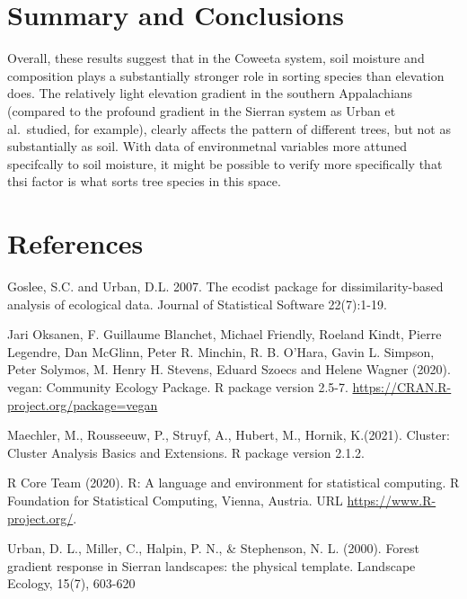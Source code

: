 \documentclass[
  12pt,
]{article}
\begin{document}
\newpage

\hypertarget{summary-and-conclusions}{%
\section{Summary and Conclusions}\label{summary-and-conclusions}}

Overall, these results suggest that in the Coweeta system, soil moisture
and composition plays a substantially stronger role in sorting species
than elevation does. The relatively light elevation gradient in the
southern Appalachians (compared to the profound gradient in the Sierran
system as Urban et al.~studied, for example), clearly affects the
pattern of different trees, but not as substantially as soil. With data
of environmetnal variables more attuned specifcally to soil moisture, it
might be possible to verify more specifically that thsi factor is what
sorts tree species in this space.

\newpage

\hypertarget{references}{%
\section{References}\label{references}}

Goslee, S.C. and Urban, D.L. 2007. The ecodist package for
dissimilarity-based analysis of ecological data. Journal of Statistical
Software 22(7):1-19.

Jari Oksanen, F. Guillaume Blanchet, Michael Friendly, Roeland Kindt,
Pierre Legendre, Dan McGlinn, Peter R. Minchin, R. B. O'Hara, Gavin L.
Simpson, Peter Solymos, M. Henry H. Stevens, Eduard Szoecs and Helene
Wagner (2020). vegan: Community Ecology Package. R package version
2.5-7. \url{https://CRAN.R-project.org/package=vegan}

Maechler, M., Rousseeuw, P., Struyf, A., Hubert, M., Hornik, K.(2021).
Cluster: Cluster Analysis Basics and Extensions. R package version
2.1.2.

R Core Team (2020). R: A language and environment for statistical
computing. R Foundation for Statistical Computing, Vienna, Austria. URL
\url{https://www.R-project.org/}.

Urban, D. L., Miller, C., Halpin, P. N., \& Stephenson, N. L. (2000).
Forest gradient response in Sierran landscapes: the physical template.
Landscape Ecology, 15(7), 603-620
\end{document}
